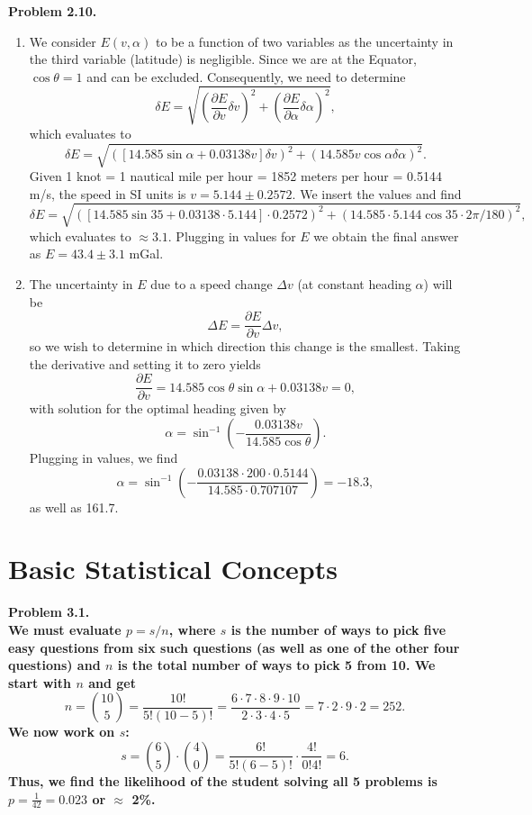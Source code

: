 \noindent
\bf{Problem 2.10.} \\

\begin{enumerate}[label=\alph*)]
\item  We consider $E(v,\alpha)$ to be a function of two variables as the uncertainty in the third variable (latitude)
is negligible.  Since we are at the Equator, $\cos \theta = 1$ and can be excluded.  Consequently, we need to determine
$$
\delta E = \sqrt{\left(\frac{\partial E}{\partial v}\delta v\right )^2 + \left(\frac{\partial E}{\partial \alpha}\delta \alpha\right )^2},
$$
which evaluates to
$$
\delta E = \sqrt{\left(\left [14.585 \sin \alpha + 0.03138v \right ]\delta v\right )^2 + \left(14.585 v \cos \alpha \delta \alpha\right )^2}.
$$
Given 1 knot = 1 nautical mile per hour = 1852 meters per hour = 0.5144 m/s, the speed in SI units is $v = 5.144 \pm 0.2572$.  We insert the values and find
$$
\delta E = \sqrt{\left(\left [14.585 \sin 35 + 0.03138\cdot5.144 \right ]\cdot 0.2572 \right )^2 + \left(14.585\cdot5.144 \cos 35\cdot 2\pi/180 \right )^2},
$$
which evaluates to $\approx 3.1$.
Plugging in values for $E$ we obtain the final answer as $E = 43.4\pm 3.1 $ mGal.
\item The uncertainty in $E$ due to a speed change $\Delta v$ (at constant heading $\alpha$) will be
$$
	\Delta E = \frac{\partial E}{\partial v} \Delta v,
$$
so we wish to determine in which direction this change is the smallest. Taking the derivative and setting it to zero
yields
$$
	\frac{\partial E}{\partial v} = 14.585 \cos \theta \sin \alpha + 0.03138 v = 0,
$$
\noindent
with solution for the optimal heading given by
$$
	\alpha = \sin^{-1} \left (-\frac{0.03138 v}{14.585\cos \theta}\right ).
$$
\noindent
Plugging in values, we find
$$
	\alpha = \sin^{-1} \left (-\frac{0.03138 \cdot 200 \cdot 0.5144}{14.585 \cdot 0.707107}\right ) = -18.3,
$$
\noindent
as well as 161.7.
	
\end{enumerate}

\section{Basic Statistical Concepts}
\noindent
\bf{Problem 3.1.} \\

We must evaluate $p = s/n$, where $s$ is the number of ways to pick five easy questions from six such questions
(as well as one of the other four questions) and $n$ is the total number of ways to pick 5 from 10.  We start with $n$ and get
$$
n = \binom{10}{5} = \frac{10!}{5!(10-5)!} = \frac{6\cdot 7\cdot 8\cdot 9\cdot 10}{2\cdot 3\cdot 4\cdot 5} = 7\cdot 2\cdot 9\cdot 2 = 252.
$$
We now work on $s$:
$$
s = \binom{6}{5}\cdot\binom{4}{0} = \frac{6!}{5!(6-5)!}\cdot \frac{4!}{0!4!} = 6.
$$
Thus, we find the likelihood of the student solving all 5 problems is $p = \frac{1}{42} = 0.023$ or $\approx$ 2\%.
\\

